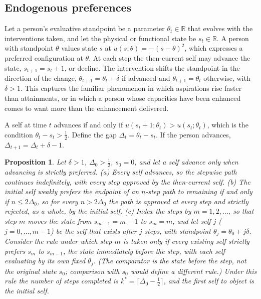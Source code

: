 \documentclass[11pt]{article}
\theoremstyle{plain}
\newtheorem{proposition}{Proposition}
\theoremstyle{definition}
\theoremstyle{remark}
\newcommand{\R}{\mathbb{R}}
\begin{document}
\subsection{Endogenous preferences}

Let a person's evaluative standpoint be a parameter $\theta_t\in\R$ that evolves with the interventions taken, and let the physical or functional state be $s_t\in\R$. A person with standpoint $\theta$ values state $s$ at $u(s;\theta)=-(s-\theta)^2$, which expresses a preferred configuration at $\theta$. At each step the then-current self may advance the state, $s_{t+1}=s_t+1$, or decline. The intervention shifts the standpoint in the direction of the change, $\theta_{t+1}=\theta_t+\delta$ if advanced and $\theta_{t+1}=\theta_t$ otherwise, with $\delta>1$. This captures the familiar phenomenon in which aspirations rise faster than attainments, or in which a person whose capacities have been enhanced comes to want more than the enhancement delivered.

A self at time $t$ advances if and only if $u(s_t+1;\theta_t)>u(s_t;\theta_t)$, which is the condition $\theta_t-s_t>\tfrac12$. Define the gap $\Delta_t=\theta_t-s_t$. If the person advances, $\Delta_{t+1}=\Delta_t+\delta-1$.

\begin{proposition}\label{prop:endog}
Let $\delta>1$, $\Delta_0>\tfrac12$, $s_0=0$, and let a self advance only when advancing is strictly preferred. (a) Every self advances, so the stepwise path continues indefinitely, with every step approved by the then-current self. (b) The initial self weakly prefers the endpoint of an $n$-step path to remaining if and only if $n\le2\Delta_0$, so for every $n>2\Delta_0$ the path is approved at every step and strictly rejected, as a whole, by the initial self. (c) Index the steps by $m=1,2,\dots$, so that step $m$ moves the state from $s_{m-1}=m-1$ to $s_m=m$, and let self $j$ ($j=0,\dots,m-1$) be the self that exists after $j$ steps, with standpoint $\theta_j=\theta_0+j\delta$. Consider the rule under which step $m$ is taken only if every existing self strictly prefers $s_m$ to $s_{m-1}$, the state immediately before the step, with each self evaluating by its own fixed $\theta_j$. (The comparator is the state before the step, not the original state $s_0$; comparison with $s_0$ would define a different rule.) Under this rule the number of steps completed is $k^\ast=\lceil\Delta_0-\tfrac12\rceil$, and the first self to object is the initial self.
\end{proposition}
\end{document}
